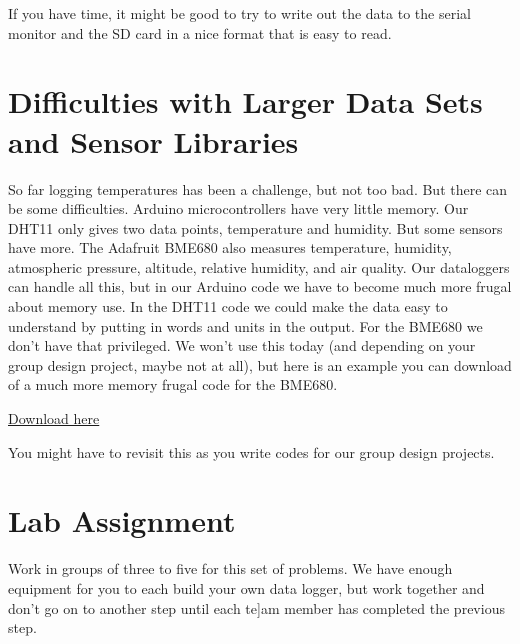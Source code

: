 If you have time, it might be good to try to write out the data to the serial monitor and the SD card in a nice format that is easy to read.

\section{Difficulties with Larger Data Sets and Sensor Libraries}
So far logging temperatures has been a challenge, but not too bad. But there can be some difficulties. Arduino microcontrollers have very little memory. Our DHT11 only gives two data points, temperature and humidity. But some sensors have more. The Adafruit BME680 also measures temperature, humidity, atmospheric pressure, altitude, relative humidity, and air quality.  Our dataloggers can handle all this, but in our Arduino code we have to become much more frugal about memory use.  In the DHT11 code we could make the data easy to understand by putting in words and units in the output.  For the BME680 we don't have that privileged.  We won't use this today (and depending on your group design project, maybe not at all), but here is an example you can download of a much more memory frugal code for the BME680.

\begin{center}
\href{https://raw.githubusercontent.com/rtlines/IntermediateLabPH250/main/Code/DataLogBME680_lines.ino}{Download here}
\end{center}

\noindent You might have to revisit this as you write codes for our group design projects.


\section{Lab Assignment}
	
	Work in groups of three to five for this set of problems. We have enough equipment for you to each build your own data logger, but work together and don't go on to another step until each te]am member has completed the previous step.
	
